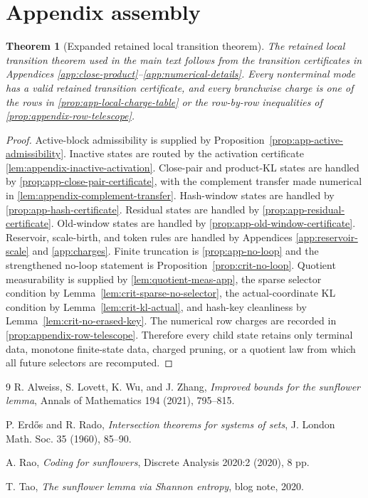 \documentclass[11pt]{article}
\newcommand{\Cref}[1]{\ref{#1}}
\newtheorem{theorem}{Theorem}[section]
\theoremstyle{remark}
\begin{document}
\section{Appendix assembly}\label{app:assembly}

\begin{theorem}[Expanded retained local transition theorem]\label{thm:app-expanded-local}
The retained local transition theorem used in the main text follows from the transition certificates in Appendices \ref{app:close-product}--\ref{app:numerical-details}.  Every nonterminal mode has a valid retained transition certificate, and every branchwise charge is one of the rows in \Cref{prop:app-local-charge-table} or the row-by-row inequalities of \Cref{prop:appendix-row-telescope}.
\end{theorem}

\begin{proof}
Active-block admissibility is supplied by Proposition~\ref{prop:app-active-admissibility}. Inactive states are routed by the activation certificate \Cref{lem:appendix-inactive-activation}.  Close-pair and product-KL states are handled by \Cref{prop:app-close-pair-certificate}, with the complement transfer made numerical in \Cref{lem:appendix-complement-transfer}.  Hash-window states are handled by \Cref{prop:app-hash-certificate}.  Residual states are handled by \Cref{prop:app-residual-certificate}.  Old-window states are handled by \Cref{prop:app-old-window-certificate}.  Reservoir, scale-birth, and token rules are handled by Appendices \ref{app:reservoir-scale} and \ref{app:charges}.  Finite truncation is \Cref{prop:app-no-loop} and the strengthened no-loop statement is Proposition~\ref{prop:crit-no-loop}.  Quotient measurability is supplied by \Cref{lem:quotient-meas-app}, the sparse selector condition by Lemma~\ref{lem:crit-sparse-no-selector}, the actual-coordinate KL condition by Lemma~\ref{lem:crit-kl-actual}, and hash-key cleanliness by Lemma~\ref{lem:crit-no-erased-key}.  The numerical row charges are recorded in \Cref{prop:appendix-row-telescope}.  Therefore every child state retains only terminal data, monotone finite-state data, charged pruning, or a quotient law from which all future selectors are recomputed.
\end{proof}

\begin{thebibliography}{9}
R. Alweiss, S. Lovett, K. Wu, and J. Zhang, \emph{Improved bounds for the sunflower lemma}, Annals of Mathematics 194 (2021), 795--815.

P. Erd\H{o}s and R. Rado, \emph{Intersection theorems for systems of sets}, J. London Math. Soc. 35 (1960), 85--90.

A. Rao, \emph{Coding for sunflowers}, Discrete Analysis 2020:2 (2020), 8 pp.

T. Tao, \emph{The sunflower lemma via Shannon entropy}, blog note, 2020.
\end{thebibliography}
\end{document}
